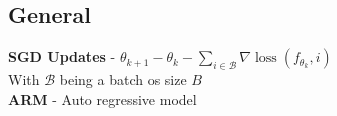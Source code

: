 

\pagestyle{empty}


\maketitle
\thispagestyle{empty}
\begin{multicols}{2}
    \section{General}
    \begin{mdframed}[style=eqbox]
        \textbf{SGD Updates} - $\theta_{k+1} - \theta_{k} - \sum_{i \in \mathcal{B}} \nabla \operatorname{loss}(f_{\theta_k}, i)$\\
        {\tiny With $\mathcal{B}$ being a batch os size $B$}\\
        \textbf{ARM} - Auto regressive model
    \end{mdframed}

\end{multicols}
